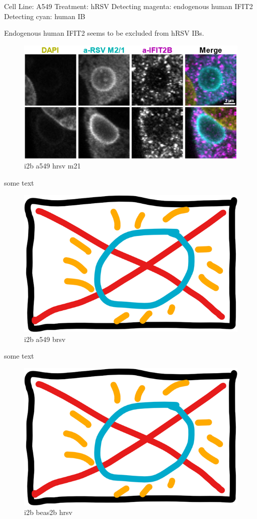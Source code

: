 Cell Line: A549 \newline
Treatment: hRSV \newline
Detecting magenta: endogenous human IFIT2  \newline
Detecting cyan: human IB \newline

Endogenous human IFIT2 seems to be excluded from hRSV IBs.

\begin{figure}
    \centering
    \includegraphics[width=1\linewidth]{09. Chapter 4//Figs//02. I2B/05. i2b a549 hrsv m21.png}
    \caption[i2b a549 hrsv m21]{i2b a549 hrsv m21}
    \label{i2b a549 hrsv m21}
\end{figure}

some text

\begin{figure}
    \centering
    \includegraphics[width=0.5\linewidth]{09. Chapter 4//Figs//02. I2B/00. placeholder.png}
    \caption[i2b a549 brsv]{i2b a549 brsv}
    \label{i2b a549 brsv}
\end{figure}

some text

\begin{figure}
    \centering
    \includegraphics[width=0.5\linewidth]{09. Chapter 4//Figs//02. I2B/00. placeholder.png}
    \caption[i2b beas2b hrsv]{i2b beas2b hrsv}
    \label{i2b beas2b hrsv}
\end{figure}

